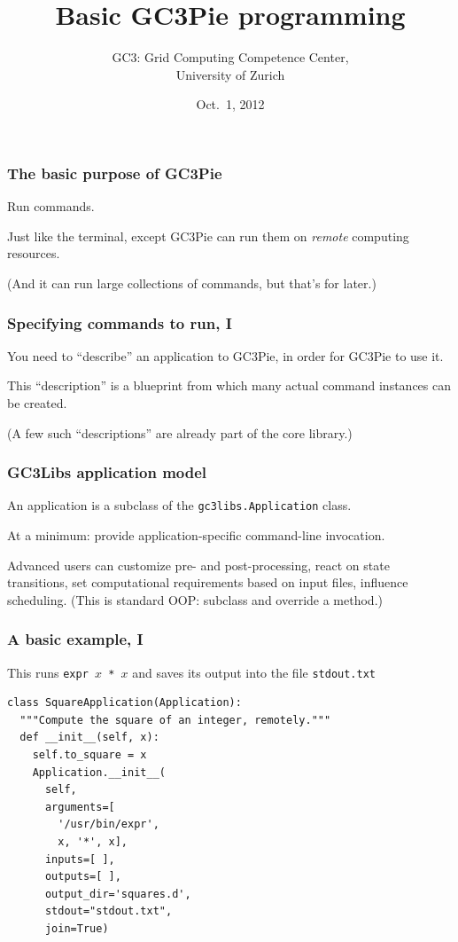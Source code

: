 \documentclass[english,serif,mathserif,xcolor=pdftex,dvipsnames,table]{beamer}
\title[GC3Pie basics]{%
  Basic GC3Pie programming
}
\author[Riccardo Murri]{%
  GC3: Grid Computing Competence Center, \\
  University of Zurich
}
\date{Oct.~1, 2012}
\begin{document}
\maketitle

\begin{frame}
  \frametitle{The basic purpose of GC3Pie}

  Run commands.

  \+
  Just like the terminal, except GC3Pie can run them on
  \emph{remote} computing resources.

  \+
  (And it can run large collections of commands, but that's for later.)

\end{frame}


\begin{frame}
  \frametitle{Specifying commands to run, I}

  You need to ``describe'' an application to GC3Pie, in order for
  GC3Pie to use it.

  \+
  This ``description'' is a blueprint from which many actual
  command instances can be created.

  \+
  (A few such ``descriptions'' are already part of the core library.)
\end{frame}


\begin{frame}
\frametitle{GC3Libs application model}

  An application is a subclass of the \texttt{gc3libs.Application} class.

  \+
  At a minimum: provide application-specific command-line invocation.

  \+
  Advanced users can customize pre- and post-processing, react on
  state transitions, set computational requirements based on input
  files, influence scheduling.  (This is standard OOP: subclass and
  override a method.)
\end{frame}

\begin{frame}[fragile]
\frametitle{A basic example, I}

  This runs \texttt{expr $x$ * $x$} and saves its output into the file \texttt{stdout.txt}

  \+
\begin{lstlisting}
class SquareApplication(Application):
  """Compute the square of an integer, remotely."""
  def __init__(self, x):
    self.to_square = x
    Application.__init__(
      self,
      arguments=[
        '/usr/bin/expr',
        x, '*', x],
      inputs=[ ],
      outputs=[ ],
      output_dir='squares.d',
      stdout="stdout.txt",
      join=True)
\end{lstlisting}
\end{frame}
\end{document}
